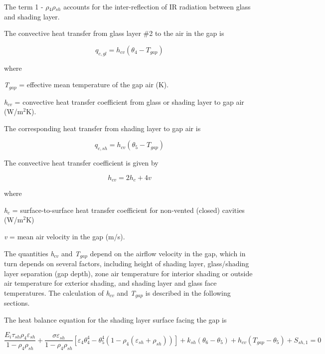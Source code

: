 The term 1 - \emph{$\rho$\(_{4}\)$\rho$\(_{sh}\)} accounts for the inter-reflection of IR radiation between glass and shading layer.

The convective heat transfer from glass layer \#2 to the air in the gap is

\begin{equation}
{q_{c,gl}} = {h_{cv}}({\theta_4} - {T_{gap}})
\end{equation}

where

\emph{T\(_{gap}\)} = effective mean temperature of the gap air (K).

\emph{h\(_{cv}\)} = convective heat transfer coefficient from glass or shading layer to gap air (W/m\(^{2}\)K).

The corresponding heat transfer from shading layer to gap air is

\begin{equation}
{q_{c,sh}} = {h_{cv}}({\theta_5} - {T_{gap}})
\end{equation}

The convective heat transfer coefficient is given by

\begin{equation}
{h_{cv}} = 2{h_c} + 4v
\end{equation}

where

\emph{h\(_{c}\)} = surface-to-surface heat transfer coefficient for non-vented (closed) cavities (W/m\(^{2}\)K)

\emph{v} = mean air velocity in the gap (m/s).

The quantities \emph{h\(_{cv}\)} and \emph{T\(_{gap}\)} depend on the airflow velocity in the gap, which in turn depends on several factors, including height of shading layer, glass/shading layer separation (gap depth), zone air temperature for interior shading or outside air temperature for exterior shading, and shading layer and glass face temperatures. The calculation of \emph{h\(_{cv}\)} and \emph{T\(_{gap}\)} is described in the following sections.

The heat balance equation for the shading layer surface facing the gap is

\begin{equation}
\frac{E_i \tau_{sh} \rho_4 \varepsilon_{sh}} {1 - \rho_4 \rho_{sh}} + 
  \frac{\sigma \varepsilon_{sh}} {1 - \rho_4 \rho_{sh}} \left[
    \varepsilon_4 \theta_4^4 - \theta_5^4 (
      1 - \rho_4( 
        \varepsilon_{sh} + \rho_{sh}
      )
    )
  \right] + 
  k_{sh} \left(
    \theta_6 - \theta_5
  \right) + 
  h_{cv} \left(
    T_{gap} - \theta_5
  \right) + 
  S_{sh,1} = 0
\end{equation}

